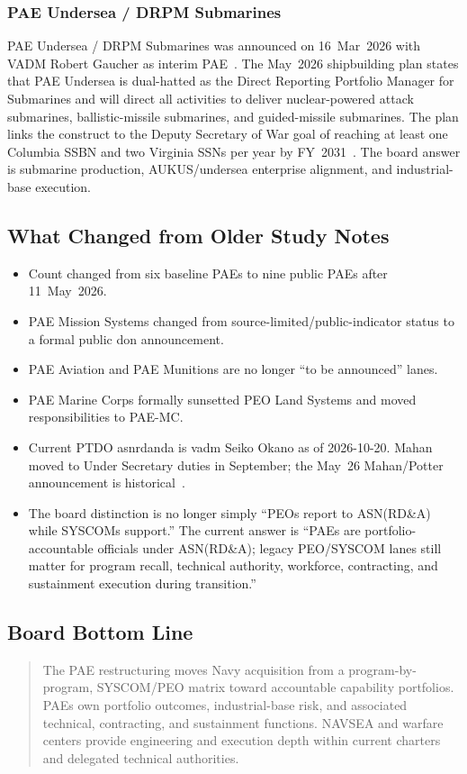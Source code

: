 \documentclass[../main.tex]{subfiles}
\begin{document}
\subsubsection{PAE Undersea / DRPM Submarines}
PAE Undersea / DRPM Submarines was announced on 16~Mar~2026 with VADM Robert Gaucher as interim PAE~\autocite{DON-PAE-Establishment-2026}. The May~2026 shipbuilding plan states that PAE Undersea is dual-hatted as the Direct Reporting Portfolio Manager for Submarines and will direct all activities to deliver nuclear-powered attack submarines, ballistic-missile submarines, and guided-missile submarines. The plan links the construct to the Deputy Secretary of War goal of reaching at least one Columbia SSBN and two Virginia SSNs per year by FY~2031~\autocite{DON-Shipbuilding-Plan-2026}. The board answer is submarine production, AUKUS/undersea enterprise alignment, and industrial-base execution.

\subsection{What Changed from Older Study Notes}
\begin{itemize}
  \item Count changed from six baseline PAEs to nine public PAEs after 11~May~2026.
  \item PAE Mission Systems changed from source-limited/public-indicator status to a formal public \ac{don} announcement.
  \item PAE Aviation and PAE Munitions are no longer ``to be announced'' lanes.
  \item PAE Marine Corps formally sunsetted PEO Land Systems and moved responsibilities to PAE-MC.
  \item Current PTDO \ac{asnrdanda} is \ac{vadm} Seiko Okano as of 2026-10-20. Mahan moved to Under Secretary duties in September; the May~26 Mahan/Potter announcement is historical~\autocite{ExecutiveGov-ASNRDA-Sep2026,DONCIO-Okano-PTDO-2026}.
  \item The board distinction is no longer simply ``PEOs report to ASN(RD\&A) while SYSCOMs support.'' The current answer is ``PAEs are portfolio-accountable officials under ASN(RD\&A); legacy PEO/SYSCOM lanes still matter for program recall, technical authority, workforce, contracting, and sustainment execution during transition.''
\end{itemize}

\subsection{Board Bottom Line}
\begin{quote}
The PAE restructuring moves Navy acquisition from a program-by-program, SYSCOM/PEO matrix toward accountable capability portfolios. PAEs own portfolio outcomes, industrial-base risk, and associated technical, contracting, and sustainment functions. NAVSEA and warfare centers provide engineering and execution depth within current charters and delegated technical authorities.
\end{quote}
\end{document}
